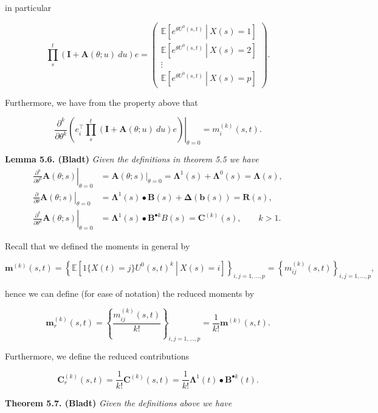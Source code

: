 \documentclass[a4paper,12pt,openany]{book}
\begin{document}
in particular

\[
\prod_s^t(\mathbf I + \mathbf A(\theta; u)\ du)e=
\begin{pmatrix}
\mathbb E\left[\left.e^{\theta U^0(s,t)}\ \right\vert\ X(s)=1\right]\\
\mathbb E\left[\left.e^{\theta U^0(s,t)}\ \right\vert\ X(s)=2\right]\\
\vdots\\
\mathbb E\left[\left.e^{\theta U^0(s,t)}\ \right\vert\ X(s)=p\right]
\end{pmatrix}.
\]

Furthermore, we have from the property above that

\[
\left.\frac{\partial^k}{\partial \theta^k}\left(e_i^\top\prod_s^t(\mathbf I + \mathbf A(\theta; u)\ du)e\right)\right\vert_{\theta = 0}=m^{(k)}_{i}(s,t).
\]

\textbf{Lemma 5.6. (Bladt)} \emph{Given the definitions in theorem 5.5 we have}
\begin{align*}
\left.\frac{\partial^0}{\partial \theta^0}\mathbf A(\theta; s)\right\vert_{\theta=0}&=\mathbf A(\theta; s)\Big\vert_{\theta=0}=\mathbf \Lambda^1(s)+\mathbf\Lambda^0(s)=\mathbf\Lambda(s),\\
\left.\frac{\partial}{\partial \theta}\mathbf A(\theta; s)\right\vert_{\theta=0}&=\mathbf \Lambda^1(s)\bullet \mathbf B(s)+\mathbf \Delta(\mathbf b(s))=\mathbf R(s),\\
\left.\frac{\partial^k}{\partial \theta^k}\mathbf A(\theta; s)\right\vert_{\theta=0}&=\mathbf \Lambda^1(s)\bullet \mathbf B^{\bullet k} B(s)=\mathbf C^{(k)}(s),\qquad k>1.
\end{align*}

Recall that we defined the moments in general by

\[
\mathbf m^{(k)}(s,t)=\left\{\mathbb E\left[\left. 1\{X(t)=j\}U^0(s,t)^k\ \right\vert\ X(s)=i\right]\right\}_{i,j=1,...,p}=\left\{m^{(k)}_{ij}(s,t)\right\}_{i,j=1,...,p},
\]

hence we can define (for ease of notation) the reduced moments by

\[
\mathbf m_r^{(k)}(s,t)=\left\{\frac{m^{(k)}_{ij}(s,t)}{k!}\right\}_{i,j=1,...,p}=\frac{1}{k!}\mathbf m^{(k)}(s,t).
\]

Furthermore, we define the reduced contributions

\[
\mathbf C^{(k)}_r(s,t)=\frac{1}{k!}\mathbf C^{(k)}(s,t)=\frac{1}{k!}\mathbf \Lambda^1(t)\bullet \mathbf B^{\bullet k}(t).
\]

\textbf{Theorem 5.7. (Bladt)} \emph{Given the definitions above we have}
\end{document}
